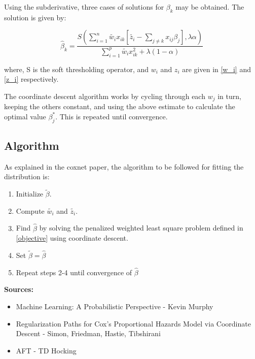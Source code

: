 \documentclass[12pt,a4paper]{report}
\begin{document}
Using the subderivative, three cases of solutions for $\beta_k$ may be obtained. The solution is given by:

\begin{equation}
\hat \beta_k = \frac{S\left(\sum_{i=1}^n \widetilde{w_i} x_{ik} \left[\widetilde{ z_i} - \sum_{j \ne k} x_{ij} \beta_j \right], \lambda \alpha \right)}
					{\sum_{i=1}^p \widetilde{w_i} x_{ik}^2 + \lambda (1- \alpha)}
\end{equation}

where, S is the soft thresholding operator, and $w_i$ and $z_i$ are given in \ref{w_i} and \ref{z_i} respectively.

The coordinate descent algorithm works by
cycling through each $w_j$ in turn, keeping the others constant, and using the above estimate to calculate the optimal value
$\beta^*_j$. This is repeated until convergence.

\subsection*{Algorithm}
As explained in the coxnet paper, the algorithm to be followed for fitting the distribution is:
\begin{enumerate}
\item Initialize $\widetilde{ \beta}$.
\item Compute $\widetilde{ w_i}$ and $\widetilde{ z_i}$.
\item Find $\hat \beta$ by solving the penalized weighted least square problem defined in \ref{objective} using coordinate descent.
\item Set $\widetilde{ \beta} = \hat \beta$
\item Repeat steps 2-4 until convergence of $\hat \beta$
\end{enumerate}

\vspace{8mm}
\textbf{Sources:}
\begin{itemize}
\item Machine Learning: A Probabilistic Perspective - Kevin Murphy
\item Regularization Paths for Cox's Proportional Hazards Model via Coordinate Descent - Simon, Friedman, Hastie, Tibshirani
\item AFT - TD Hocking
\end{itemize}
\end{document}
